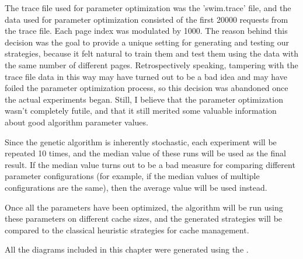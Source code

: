 The trace file used for parameter optimization was the 'swim.trace' file, and the data used for parameter optimization consisted of the first 20000 requests from the trace file. Each page index was modulated by 1000. The reason behind this decision was the goal to provide a unique setting for generating and testing our strategies, because it felt natural to train them and test them using the data with the same number of different pages. Retrospectively speaking, tampering with the trace file data in this way may have turned out to be a bad idea and may have foiled the parameter optimization process, so this decision was abandoned once the actual experiments began. Still, I believe that the parameter optimization wasn't completely futile, and that it still merited some valuable information about good algorithm parameter values.

Since the genetic algorithm is inherently stochastic, each experiment will be repeated 10 times, and the median value of these runs will be used as the final result. If the median value turns out to be a bad measure for comparing different parameter configurations (for example, if the median values of multiple configurations are the same), then the average value will be used instead.

Once all the parameters have been optimized, the algorithm will be run using these parameters on different cache sizes, and the generated strategies will be compared to the classical heuristic strategies for cache management.

All the diagrams included in this chapter were generated using the \citep{box_plots}.